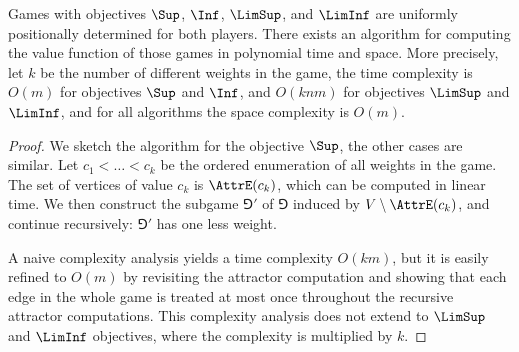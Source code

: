 \begin{theorem}
\label{4-thm:sup-inf-limsup-liminf}
Games with objectives $\Sup$, $\Inf$, $\LimSup$, and $\LimInf$ are uniformly positionally determined for both players.
There exists an algorithm for computing the value function of those games in polynomial time and space.
More precisely, let $k$ be the number of different weights in the game,
the time complexity is $O(m)$ for objectives $\Sup$ and $\Inf$, and
$O(knm)$ for objectives $\LimSup$ and $\LimInf$,
and for all algorithms the space complexity is $O(m)$.
\end{theorem}

\begin{proof}
We sketch the algorithm for the objective $\Sup$, the other cases are similar.
Let $c_1 < \dots < c_k$ be the ordered enumeration of all weights in the game.
The set of vertices of value $c_k$ is $\AttrE(c_k)$, which can be computed in linear time.
We then construct the subgame $\Game'$ of $\Game$ induced by $V \setminus \AttrE(c_k)$,
and continue recursively: $\Game'$ has one less weight.

A naive complexity analysis yields a time complexity $O(km)$, but it is easily refined to $O(m)$ 
by revisiting the attractor computation and showing that each edge in the whole game is treated at most once
throughout the recursive attractor computations.
This complexity analysis does not extend to $\LimSup$ and $\LimInf$ objectives, where the complexity is multiplied by $k$.
\end{proof}
